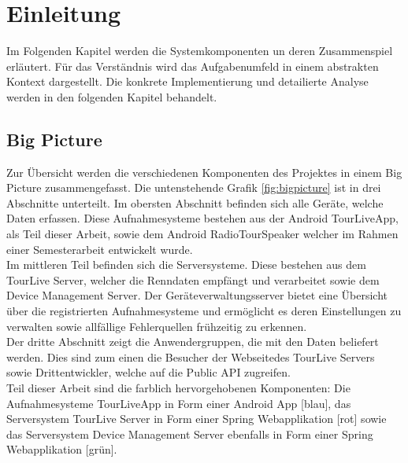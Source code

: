 \chapter{Einleitung}

Im Folgenden Kapitel werden die Systemkomponenten un deren Zusammenspiel erläutert. Für das Verständnis wird das Aufgabenumfeld in einem abstrakten Kontext dargestellt. Die konkrete Implementierung und detailierte Analyse werden in den folgenden Kapitel behandelt.

\section{Big Picture}
Zur Übersicht werden die verschiedenen Komponenten des Projektes in einem Big Picture zusammengefasst. Die untenstehende Grafik \ref{fig:bigpicture} ist in drei Abschnitte unterteilt. Im obersten Abschnitt befinden sich alle Geräte, welche Daten erfassen. Diese Aufnahmesysteme bestehen aus der Android TourLiveApp, als Teil dieser Arbeit, sowie dem Android RadioTourSpeaker welcher im Rahmen einer Semesterarbeit \cite{radiotourspeaker2012} entwickelt wurde.\\

Im mittleren Teil befinden sich die Serversysteme. Diese bestehen aus dem TourLive Server, welcher die Renndaten empfängt und verarbeitet sowie dem Device Management Server. Der Geräteverwaltungsserver bietet eine Übersicht über die registrierten Aufnahmesysteme und ermöglicht es deren Einstellungen zu verwalten sowie allfällige Fehlerquellen frühzeitig zu erkennen.\\

Der dritte Abschnitt zeigt die Anwendergruppen, die mit den Daten beliefert werden. Dies sind zum einen die Besucher der Webseitedes TourLive Servers sowie Drittentwickler, welche auf die Public API zugreifen.\\

Teil dieser Arbeit sind die farblich hervorgehobenen Komponenten: Die Aufnahmesysteme TourLiveApp in Form einer Android App [blau], das Serversystem TourLive Server in Form einer Spring Webapplikation [rot] sowie das Serversystem Device Management Server ebenfalls in Form einer Spring Webapplikation [grün].

